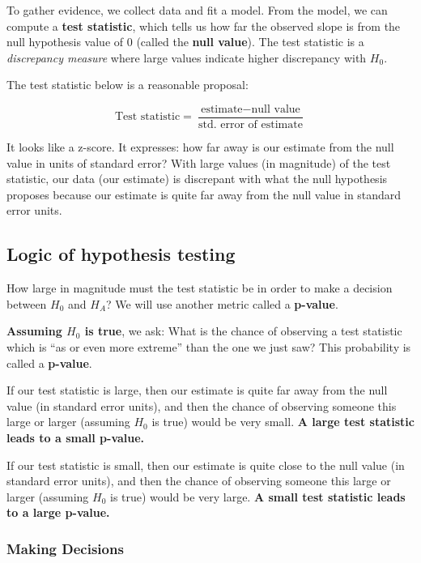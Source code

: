 \documentclass[]{book}
\begin{document}
To gather evidence, we collect data and fit a model. From the model, we can compute a \textbf{test statistic}, which tells us how far the observed slope is from the null hypothesis value of 0 (called the \textbf{null value}). The test statistic is a \emph{discrepancy measure} where large values indicate higher discrepancy with \(H_0\).

The test statistic below is a reasonable proposal:

\[\text{Test statistic} = \frac{\text{estimate} - \text{null value}}{\text{std. error of estimate}}\]

It looks like a z-score. It expresses: how far away is our estimate from the null value in units of standard error? With large values (in magnitude) of the test statistic, our data (our estimate) is discrepant with what the null hypothesis proposes because our estimate is quite far away from the null value in standard error units.

\hypertarget{logic-of-hypothesis-testing}{%
\subsection{Logic of hypothesis testing}\label{logic-of-hypothesis-testing}}

How large in magnitude must the test statistic be in order to make a decision between \(H_0\) and \(H_A\)? We will use another metric called a \textbf{p-value}.

\textbf{Assuming \(H_0\) is true}, we ask: What is the chance of observing a test statistic which is ``as or even more extreme'' than the one we just saw? This probability is called a \textbf{p-value}.

If our test statistic is large, then our estimate is quite far away from the null value (in standard error units), and then the chance of observing someone this large or larger (assuming \(H_0\) is true) would be very small. \textbf{A large test statistic leads to a small p-value.}

If our test statistic is small, then our estimate is quite close to the null value (in standard error units), and then the chance of observing someone this large or larger (assuming \(H_0\) is true) would be very large. \textbf{A small test statistic leads to a large p-value.}

\hypertarget{making-decisions}{%
\subsubsection{Making Decisions}\label{making-decisions}}
\end{document}
